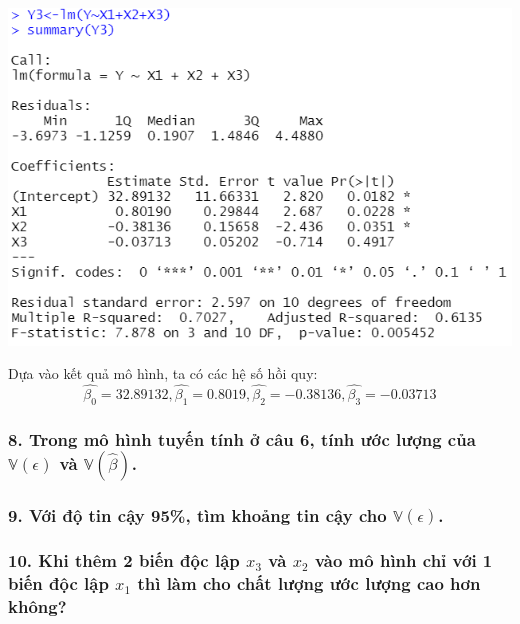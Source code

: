 \documentclass[a4paper]{article}
\theoremstyle{nonumberplain}
\begin{document}
\begin{center}
\includegraphics{bai3_6.PNG} 
\end{center}
Dựa vào kết quả mô hình, ta có các hệ số hồi quy:
$$\hat{\beta_0} = 32.89132, \hat{\beta_1} = 0.8019, \hat{\beta_2} = -0.38136, \hat{\beta_3} = -0.03713$$
\subsubsection*{8. Trong mô hình tuyến tính ở câu 6, tính ước lượng của $\mathbb{V}(\epsilon)$ và $\mathbb{V}(\hat{\beta})$.}


\subsubsection*{9. Với độ tin cậy 95\%, tìm khoảng tin cậy cho $\mathbb{V}(\epsilon)$. }


\subsubsection*{10. Khi thêm 2 biến độc lập $x_3$ và $x_2$ vào mô hình chỉ với 1 biến độc lập $x_1$ thì làm cho chất
lượng ước lượng cao hơn không?}
\end{document}
